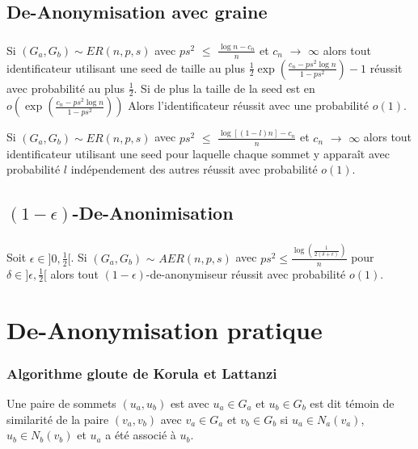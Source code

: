 \documentclass[11pt]{beamer}
\begin{document}
\subsection{De-Anonymisation avec graine}

\begin{frame}
\frametitle{\insertsubsection}
\begin{theoreme}
Si $(G_a,G_b) \sim ER(n,p,s)$ avec $ps^{2}$ $\leq$ $\frac{\log n - c_n}{n}$ et $c_n$ $\rightarrow$ $\infty$ alors tout identificateur utilisant une seed de taille au plus $\frac{1}{2} \exp(\frac{c_n - ps^{2} \log n}{1-ps^{2}}) - 1$ réussit avec probabilité au plus $\frac{1}{2}$. Si de plus la taille de la seed est en $o( \exp(\frac{c_n - ps^{2} \log n}{1-ps^{2}}))$ Alors l'identificateur réussit avec une probabilité $o(1)$.
\end{theoreme}
\begin{theoreme}
Si $(G_a,G_b) \sim ER(n,p,s)$ avec $ps^{2}$ $\leq$ $\frac{\log[(1-l) n] - c_n}{n}$ et $c_n$ $\rightarrow$ $\infty$ alors tout identificateur utilisant une seed pour laquelle chaque sommet y apparaît avec probabilité $l$ indépendement des autres réussit avec probabilité $o(1)$. 
\end{theoreme}
\end{frame}

\subsection{$(1-\epsilon)$-De-Anonimisation}

\begin{frame}
\frametitle{\insertsubsection}
\begin{theoreme}
Soit $\epsilon \in ]0,\frac{1}{2}[$. Si $(G_a,G_b)$ $\sim$ $AER(n,p,s)$ avec $ps^2 \leq \frac{\log(\frac{1}{2 (\delta + \epsilon)})}{n}$ pour $\delta \in ]\epsilon, \frac{1}{2}[$ alors tout $(1-\epsilon)$-de-anonymiseur réussit avec probabilité $o(1)$.
\end{theoreme}
\end{frame}

\section{De-Anonymisation pratique}

\begin{frame}
\frametitle{Algorithme gloute de Korula et Lattanzi}
\begin{defi}
Une paire de sommets $(u_a,u_b)$ est avec $u_a \in G_a$ et $u_b \in G_b$ est dit témoin de similarité de la paire $(v_a,v_b)$ avec $v_a \in G_a$ et $v_b \in G_b$ si $u_a \in N_a(v_a)$, $u_b \in N_b(v_b)$ et $u_a$ a été associé à $u_b$.
\end{defi}
\end{frame}
\end{document}
